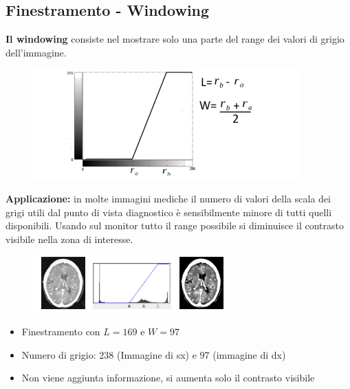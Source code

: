 \subsection{Finestramento - Windowing}

\begin{definition}
    \textbf{Il windowing} consiste nel mostrare solo una parte del range dei
    valori di grigio dell'immagine.
\end{definition}

\begin{figure}[H]
    \centering
    \includegraphics[width=\linewidth, keepaspectratio]{capitoli/immagini/imgs/win1.png}
\end{figure}

\textbf{Applicazione:} in molte immagini mediche il numero di valori della scala
dei grigi utili dal punto di vista diagnostico è sensibilmente minore di tutti
quelli disponibili. Usando sul monitor tutto il range possibile si diminuisce il
contrasto visibile nella zona di interesse.

\begin{figure}[H]
    \centering
    \includegraphics[width=\linewidth, keepaspectratio]{capitoli/immagini/imgs/windowing.png}
\end{figure}

\begin{itemize}
    \item Finestramento con $L = 169$ e $W = 97$
    \item Numero di grigio: $238$ (Immagine di sx) e $97$ (immagine di dx)
    \item Non viene aggiunta informazione, si aumenta solo il contrasto visibile
\end{itemize}

